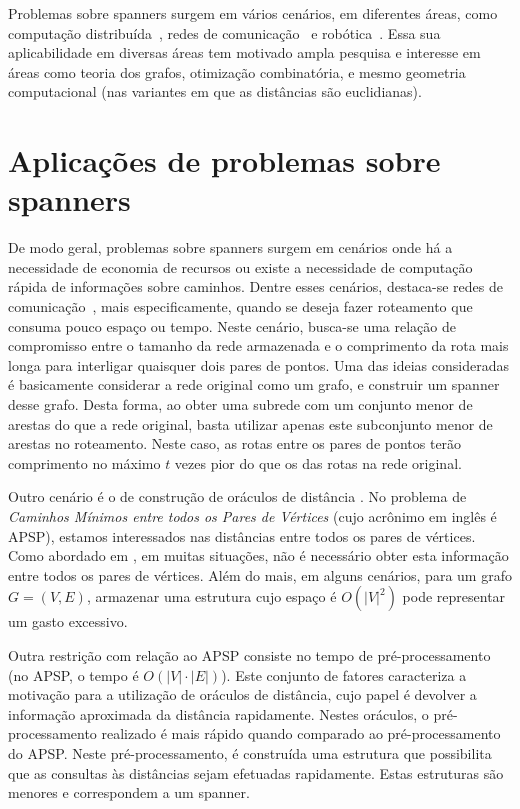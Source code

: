 Problemas sobre spanners surgem em vários cenários, em diferentes áreas, como computação distribuída~\cite{Awerbuch1985,PelegU1989}, redes de comunicação~\cite{PelegU1988,PelegR1999,OliveiraP2005} e robótica~\cite{ArikatiCCDSZ1996}. Essa sua aplicabilidade em diversas áreas tem motivado ampla pesquisa e interesse em áreas como teoria dos grafos, otimização combinatória, e mesmo geometria computacional (nas variantes em que as distâncias são euclidianas).

\section{Aplicações de problemas sobre spanners}
\label{sec:aplicacoes}
De modo geral, problemas sobre spanners surgem em cenários onde há a necessidade de economia de recursos ou existe a necessidade de computação rápida de informações sobre caminhos.  Dentre esses cenários, destaca-se redes de comunicação~\cite{PelegU1988,PelegR1999,OliveiraP2005, RodittyTZ2008}, mais especificamente, quando se deseja fazer roteamento que consuma pouco espaço ou tempo.  Neste cenário, busca-se uma relação de compromisso entre o tamanho da rede armazenada e o comprimento da rota mais longa para interligar quaisquer dois pares de pontos.  Uma das ideias consideradas é basicamente considerar a rede original como um grafo, e construir  um spanner desse grafo. Desta forma, ao obter uma subrede com um conjunto menor de arestas do que a rede original, basta utilizar apenas este subconjunto menor de arestas no roteamento. Neste caso, as rotas 
entre os pares de pontos terão comprimento no máximo $t$ vezes pior do que os das rotas na rede original. 

Outro cenário é o de construção de oráculos de distância \cite{RodittyTZ2005,ThorupZ2005,ElkinP2016,Sommer2016,Knudsen2017}.  No problema de \emph{Caminhos Mínimos entre todos os Pares de
  Vértices} (cujo acrônimo em inglês é APSP),  estamos interessados nas
distâncias entre todos os pares de vértices.
Como abordado
em \cite{ThorupZ2005}, em muitas situações,
 não é necessário obter esta informação entre todos os pares de vértices. 
Além do mais, em alguns cenários, para um grafo $G=(V,E)$, armazenar
uma estrutura cujo espaço é $O(|V|^2)$ pode representar um gasto excessivo. 

Outra restrição com relação ao APSP consiste no tempo de pré-processamento 
(no APSP, o tempo é $O(|V| \cdot |E|)$). 
Este conjunto de fatores
caracteriza a motivação para a utilização de oráculos de distância, cujo
papel é devolver a informação aproximada da distância rapidamente. 
Nestes oráculos, o pré-processamento realizado é mais rápido quando comparado
ao pré-processamento do APSP. Neste pré-processamento, é construída uma
estrutura que possibilita que as consultas às distâncias sejam efetuadas
rapidamente. Estas estruturas são menores e correspondem a um spanner. 

